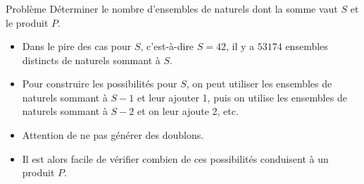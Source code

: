 \begin{frame}
    \frametitle{\problemtitle}
    \begin{block}{Problème}
        Déterminer le nombre d'ensembles de naturels dont la somme vaut $S$ et le produit $P$.
    \end{block}
    \pause
    \begin{itemize}[<+->]
        \item Dans le pire des cas pour $S$, c'est-à-dire $S=42$, il y a $53174$ ensembles distincts de naturels sommant à $S$.
        \item<+-> Pour construire les possibilités pour $S$, on peut utiliser les ensembles de naturels sommant à $S-1$ et leur ajouter 1, puis on utilise les ensembles de naturels sommant à $S-2$ et on leur ajoute 2, etc.
        \item Attention de ne pas générer des doublons.
        \item Il est alors facile de vérifier combien de ces possibilités conduisent à un produit $P$.
    \end{itemize}

    \solvestats
\end{frame}